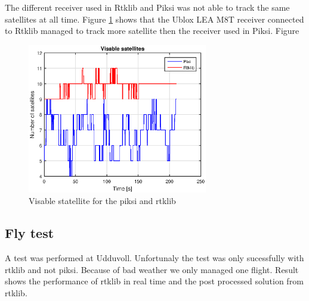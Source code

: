 The different receiver used in Rtklib and Piksi was not able to track the same satellites at all time. Figure \ref{figure:NumSatWalk1} shows that the Ublox LEA M8T receiver connected to Rtklib managed to track more satellite then the receiver used in Piksi.
Figure 
\begin{figure}[H]
	\centering
		\includegraphics[width=0.7\textwidth]{figs/plots/sv.eps}
		\caption{Visable statellite for the piksi and rtklib}
		\label{figure:NumSatWalk1}
\end{figure}
\subsection{Fly test}
A test was performed at Udduvoll. Unfortunaly the test was only sucessfully with rtklib and not piksi. Because of bad weather we only managed one flight. Result shows the performance of rtklib in real time and the post processed solution from rtklib.
\cleardoublepage